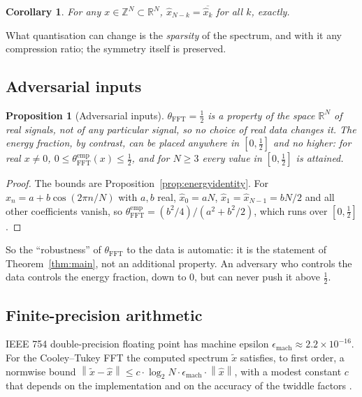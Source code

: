 \documentclass[12pt]{article}
\newtheorem{proposition}[theorem]{Proposition}
\newtheorem{corollary}[theorem]{Corollary}
\theoremstyle{definition}
\newcommand{\Z}{\mathbb{Z}}
\newcommand{\R}{\mathbb{R}}
\newcommand{\norm}[1]{\left\|#1\right\|}
\newcommand{\thetaFFT}{\theta_{\mathrm{FFT}}}
\begin{document}
\begin{corollary}\label{cor:quantised}
For any $x \in \Z^N \subset \R^N$, $\hat{x}_{N-k} = \overline{\hat{x}_k}$
for all $k$, exactly.
\end{corollary}

What quantisation can change is the \emph{sparsity} of the spectrum,
and with it any compression ratio; the symmetry itself is preserved.

\subsection{Adversarial inputs}

\begin{proposition}[Adversarial inputs]\label{prop:adversarial}
$\thetaFFT = \tfrac{1}{2}$ is a property of the space $\R^N$ of real
signals, not of any particular signal, so no choice of real data
changes it.  The energy fraction, by
contrast, can be placed anywhere in $[0, \tfrac{1}{2}]$ and no higher:
for real $x \neq 0$, $0 \leq \thetaFFT^{\mathrm{emp}}(x) \leq \tfrac{1}{2}$,
and for $N \geq 3$ every value in $[0, \tfrac{1}{2}]$ is attained.
\end{proposition}

\begin{proof}
The bounds are Proposition~\ref{prop:energyidentity}.  For
$x_n = a + b\cos(2\pi n/N)$ with $a, b$ real, $\hat{x}_0 = aN$,
$\hat{x}_1 = \hat{x}_{N-1} = bN/2$ and all other coefficients vanish, so
$\thetaFFT^{\mathrm{emp}} = (b^2/4)/(a^2 + b^2/2)$, which runs over
$[0, \tfrac{1}{2}]$.
\end{proof}

So the ``robustness'' of $\thetaFFT$ to the data is automatic: it is the
statement of Theorem~\ref{thm:main}, not an additional property.  An
adversary who controls the data controls the energy fraction, down to
$0$, but can never push it above $\tfrac{1}{2}$.

\subsection{Finite-precision arithmetic}

IEEE 754 double-precision floating point has machine epsilon
$\epsilon_{\mathrm{mach}} \approx 2.2 \times 10^{-16}$.  For the
Cooley--Tukey FFT the computed spectrum $\tilde{x}$ satisfies, to first
order, a normwise bound
$\norm{\tilde{x} - \hat{x}} \leq c \cdot \log_2 N \cdot \epsilon_{\mathrm{mach}} \cdot \norm{\hat{x}}$,
with a modest constant $c$ that depends on the implementation and on the
accuracy of the twiddle factors \cite{Higham2002}.
\end{document}
